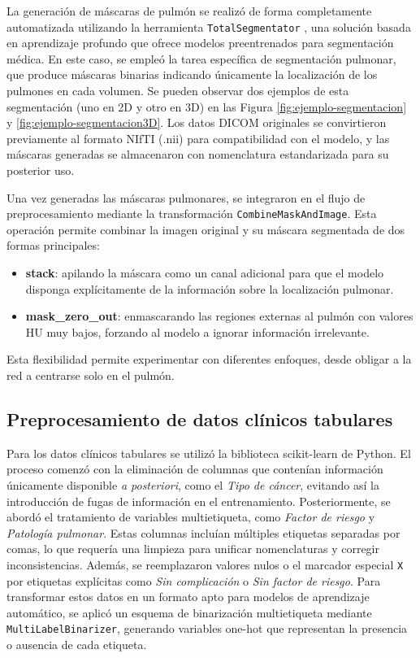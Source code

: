 La generación de máscaras de pulmón se realizó de forma completamente automatizada utilizando la herramienta \texttt{TotalSegmentator} \parencite{wasserthal2023totalsegmentator}, una solución basada en aprendizaje profundo que ofrece modelos preentrenados para segmentación médica. En este caso, se empleó la tarea específica de segmentación pulmonar, que produce máscaras binarias indicando únicamente la localización de los pulmones en cada volumen. Se pueden observar dos ejemplos de esta segmentación (uno en 2D y otro en 3D) en las Figura \ref{fig:ejemplo-segmentacion} y \ref{fig:ejemplo-segmentacion3D}. Los datos DICOM originales se convirtieron previamente al formato NIfTI (.nii) para compatibilidad con el modelo, y las máscaras generadas se almacenaron con nomenclatura estandarizada para su posterior uso.

Una vez generadas las máscaras pulmonares, se integraron en el flujo de preprocesamiento mediante la transformación \texttt{CombineMaskAndImage}. Esta operación permite combinar la imagen original y su máscara segmentada de dos formas principales: 
\begin{itemize}
    \item \textbf{stack}: apilando la máscara como un canal adicional para que el modelo disponga explícitamente de la información sobre la localización pulmonar.
    \item \textbf{mask\_zero\_out}: enmascarando las regiones externas al pulmón con valores HU muy bajos, forzando al modelo a ignorar información irrelevante.
\end{itemize}
Esta flexibilidad permite experimentar con diferentes enfoques, desde obligar a la red a centrarse solo en el pulmón.

\subsection{Preprocesamiento de datos clínicos tabulares}

Para los datos clínicos tabulares se utilizó la biblioteca scikit-learn de Python. El proceso comenzó con la eliminación de columnas que contenían información únicamente disponible \textit{a posteriori}, como el \textit{Tipo de cáncer}, evitando así la introducción de fugas de información en el entrenamiento. Posteriormente, se abordó el tratamiento de variables multietiqueta, como \textit{Factor de riesgo} y \textit{Patología pulmonar}. Estas columnas incluían múltiples etiquetas separadas por comas, lo que requería una limpieza para unificar nomenclaturas y corregir inconsistencias. Además, se reemplazaron valores nulos o el marcador especial \texttt{X} por etiquetas explícitas como \textit{Sin complicación} o \textit{Sin factor de riesgo}. Para transformar estos datos en un formato apto para modelos de aprendizaje automático, se aplicó un esquema de binarización multietiqueta mediante \texttt{MultiLabelBinarizer}, generando variables one-hot que representan la presencia o ausencia de cada etiqueta.

